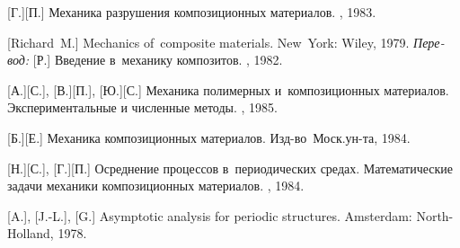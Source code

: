 \begin{thebibliography}{123}
\begin{otherlanguage}{russian}
[Г.][П.]
Механика разрушения композиционных материалов.
\naukapublisher, 1983.

%
%



[Richard~M.] Mechanics of~composite materials. New~York: Wiley, 1979. 
\emph{Перевод:} [Р.] Введение в~механику композитов. \mirpublisher, 1982. 

[А.][С.], [В.][П.], [Ю.][С.] Механика полимерных и~композиционных материалов. Экспериментальные и численные методы. \naukapublisher, 1985. 

[Б.][Е.] Механика композиционных материалов. Изд\hbox{-}во~Моск.\:ун\hbox{-}та, 1984. 

[Н.][С.], [Г.][П.] Осреднение процессов в~периодических средах. Математические задачи механики композиционных материалов. \naukapublisher, 1984. 

[A.], %
[J.-L.], %
[G.]
Asymptotic analysis for periodic structures. Amsterdam: North\hbox{-}Holland, 1978. 

%
%




\end{otherlanguage}
\end{thebibliography}
